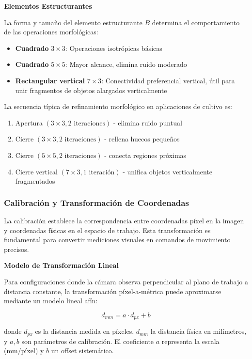 \textbf{Elementos Estructurantes}

La forma y tamaño del elemento estructurante $B$ determina el comportamiento de las operaciones morfológicas:

\begin{itemize}
\item \textbf{Cuadrado} $3 \times 3$: Operaciones isotrópicas básicas
\item \textbf{Cuadrado} $5 \times 5$: Mayor alcance, elimina ruido moderado
\item \textbf{Rectangular vertical} $7 \times 3$: Conectividad preferencial vertical, útil para unir fragmentos de objetos alargados verticalmente
\end{itemize}

La secuencia típica de refinamiento morfológico en aplicaciones de cultivo es:

\begin{enumerate}
\item Apertura $(3 \times 3, 2 \text{ iteraciones})$ - elimina ruido puntual
\item Cierre $(3 \times 3, 2 \text{ iteraciones})$ - rellena huecos pequeños
\item Cierre $(5 \times 5, 2 \text{ iteraciones})$ - conecta regiones próximas
\item Cierre vertical $(7 \times 3, 1 \text{ iteración})$ - unifica objetos verticalmente fragmentados
\end{enumerate}

\subsubsection{Calibración y Transformación de Coordenadas}

La calibración establece la correspondencia entre coordenadas píxel en la imagen y coordenadas físicas en el espacio de trabajo. Esta transformación es fundamental para convertir mediciones visuales en comandos de movimiento precisos.

\textbf{Modelo de Transformación Lineal}

Para configuraciones donde la cámara observa perpendicular al plano de trabajo a distancia constante, la transformación píxel-a-métrica puede aproximarse mediante un modelo lineal afín:

\begin{equation}
d_{mm} = a \cdot d_{px} + b
\end{equation}

donde $d_{px}$ es la distancia medida en píxeles, $d_{mm}$ la distancia física en milímetros, y $a, b$ son parámetros de calibración. El coeficiente $a$ representa la escala (mm/píxel) y $b$ un offset sistemático.

